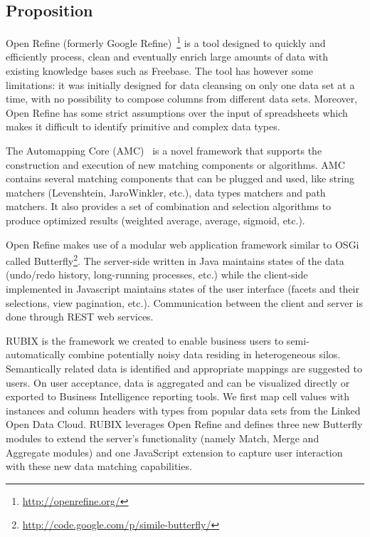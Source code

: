 
\subsection{Proposition}\label{Section:RUBIX}

Open Refine (formerly Google Refine)~\footnote{\url{http://openrefine.org/}} is a tool designed to quickly and efficiently process, clean and eventually enrich large amounts of data with existing knowledge bases such as Freebase. The tool has however some limitations: it was initially designed for data cleansing on only one data set at a time, with no possibility to compose columns from different data sets. Moreover, Open Refine has some strict assumptions over the input of spreadsheets which makes it difficult to identify primitive and complex data types.

The Automapping Core (AMC)~\cite{Peukert:ICDE:12} is a novel framework that supports the construction and execution of new matching components or algorithms. AMC contains several matching components that can be plugged and used, like string matchers (Levenshtein, JaroWinkler, etc.), data types matchers and path matchers. It also provides a set of combination and selection algorithms to produce optimized results (weighted average, average, sigmoid,  etc.).

Open Refine makes use of a modular web application framework similar to OSGi called Butterfly\footnote{\url{http://code.google.com/p/simile-butterfly/}}. The server-side written in Java maintains states of the data (undo/redo history, long-running processes, etc.) while the client-side implemented in Javascript maintains states of the user interface (facets and their selections, view pagination, etc.). Communication between the client and server is done through REST web services.

RUBIX is the framework we created to enable business users to semi-automatically combine potentially noisy data residing in heterogeneous silos. Semantically related data is identified and appropriate mappings are suggested to users. On user acceptance, data is aggregated and can be visualized directly or exported to Business Intelligence reporting tools. We first map cell values with instances and column headers with types from popular data sets from the Linked Open Data Cloud. RUBIX leverages Open Refine and defines three new Butterfly modules to extend the server's functionality (namely Match, Merge and Aggregate modules) and one JavaScript extension to capture user interaction with these new data matching capabilities.

